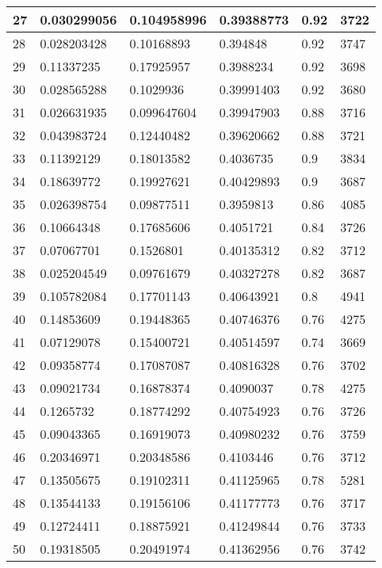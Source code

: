 \begin{longtable}{|l|l|l|l|l|l|}
27 & 0.030299056 & 0.104958996 & 0.39388773 & 0.92 & 3722 \\ \hline 
28 & 0.028203428 & 0.10168893 & 0.394848 & 0.92 & 3747 \\ \hline 
29 & 0.11337235 & 0.17925957 & 0.3988234 & 0.92 & 3698 \\ \hline 
30 & 0.028565288 & 0.1029936 & 0.39991403 & 0.92 & 3680 \\ \hline 
31 & 0.026631935 & 0.099647604 & 0.39947903 & 0.88 & 3716 \\ \hline 
32 & 0.043983724 & 0.12440482 & 0.39620662 & 0.88 & 3721 \\ \hline 
33 & 0.11392129 & 0.18013582 & 0.4036735 & 0.9 & 3834 \\ \hline 
34 & 0.18639772 & 0.19927621 & 0.40429893 & 0.9 & 3687 \\ \hline 
35 & 0.026398754 & 0.09877511 & 0.3959813 & 0.86 & 4085 \\ \hline 
36 & 0.10664348 & 0.17685606 & 0.4051721 & 0.84 & 3726 \\ \hline 
37 & 0.07067701 & 0.1526801 & 0.40135312 & 0.82 & 3712 \\ \hline 
38 & 0.025204549 & 0.09761679 & 0.40327278 & 0.82 & 3687 \\ \hline 
39 & 0.105782084 & 0.17701143 & 0.40643921 & 0.8 & 4941 \\ \hline 
40 & 0.14853609 & 0.19448365 & 0.40746376 & 0.76 & 4275 \\ \hline 
41 & 0.07129078 & 0.15400721 & 0.40514597 & 0.74 & 3669 \\ \hline 
42 & 0.09358774 & 0.17087087 & 0.40816328 & 0.76 & 3702 \\ \hline 
43 & 0.09021734 & 0.16878374 & 0.4090037 & 0.78 & 4275 \\ \hline 
44 & 0.1265732 & 0.18774292 & 0.40754923 & 0.76 & 3726 \\ \hline 
45 & 0.09043365 & 0.16919073 & 0.40980232 & 0.76 & 3759 \\ \hline 
46 & 0.20346971 & 0.20348586 & 0.4103446 & 0.76 & 3712 \\ \hline 
47 & 0.13505675 & 0.19102311 & 0.41125965 & 0.78 & 5281 \\ \hline 
48 & 0.13544133 & 0.19156106 & 0.41177773 & 0.76 & 3717 \\ \hline 
49 & 0.12724411 & 0.18875921 & 0.41249844 & 0.76 & 3733 \\ \hline 
50 & 0.19318505 & 0.20491974 & 0.41362956 & 0.76 & 3742 \\ \hline 
\end{longtable}